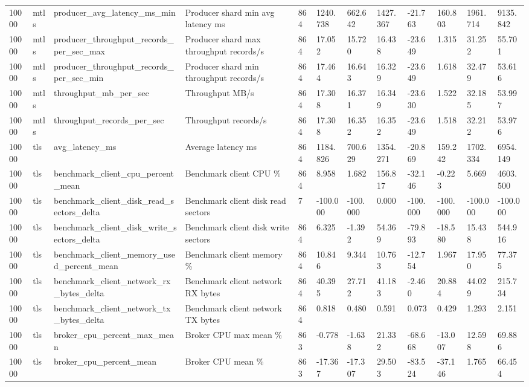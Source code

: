 \begin{longtable}{llllllllllll}
10000 & mtls & producer\_avg\_latency\_ms\_min & Producer shard min avg latency ms & 864 & 1240.738 & 662.642 & 1427.367 & -21.763 & 160.803 & 1961.714 & 9135.842 \\
10000 & mtls & producer\_throughput\_records\_per\_sec\_max & Producer shard max throughput records/s & 864 & 17.052 & 15.720 & 16.438 & -23.649 & 1.315 & 31.252 & 55.701 \\
10000 & mtls & producer\_throughput\_records\_per\_sec\_min & Producer shard min throughput records/s & 864 & 17.464 & 16.643 & 16.329 & -23.649 & 1.618 & 32.479 & 53.616 \\
10000 & mtls & throughput\_mb\_per\_sec & Throughput MB/s & 864 & 17.308 & 16.371 & 16.349 & -23.630 & 1.522 & 32.185 & 53.997 \\
10000 & mtls & throughput\_records\_per\_sec & Throughput records/s & 864 & 17.308 & 16.352 & 16.352 & -23.649 & 1.518 & 32.212 & 53.976 \\
10000 & tls & avg\_latency\_ms & Average latency ms & 864 & 1184.826 & 700.629 & 1354.271 & -20.869 & 159.242 & 1702.334 & 6954.149 \\
10000 & tls & benchmark\_client\_cpu\_percent\_mean & Benchmark client CPU \% & 864 & 8.958 & 1.682 & 156.817 & -32.146 & -0.223 & 5.669 & 4603.500 \\
10000 & tls & benchmark\_client\_disk\_read\_sectors\_delta & Benchmark client disk read sectors & 7 & -100.000 & -100.000 & 0.000 & -100.000 & -100.000 & -100.000 & -100.000 \\
10000 & tls & benchmark\_client\_disk\_write\_sectors\_delta & Benchmark client disk write sectors & 864 & 6.325 & -1.392 & 54.369 & -79.893 & -18.580 & 15.438 & 544.916 \\
10000 & tls & benchmark\_client\_memory\_used\_percent\_mean & Benchmark client memory \% & 864 & 10.846 & 9.344 & 10.763 & -12.754 & 1.967 & 17.950 & 77.375 \\
10000 & tls & benchmark\_client\_network\_rx\_bytes\_delta & Benchmark client network RX bytes & 864 & 40.395 & 27.712 & 41.183 & -2.460 & 20.884 & 44.029 & 215.734 \\
10000 & tls & benchmark\_client\_network\_tx\_bytes\_delta & Benchmark client network TX bytes & 864 & 0.818 & 0.480 & 0.591 & 0.073 & 0.429 & 1.293 & 2.151 \\
10000 & tls & broker\_cpu\_percent\_max\_mean & Broker CPU max mean \% & 863 & -0.778 & -1.638 & 21.332 & -68.668 & -13.007 & 12.598 & 69.886 \\
10000 & tls & broker\_cpu\_percent\_mean & Broker CPU mean \% & 863 & -17.367 & -17.307 & 29.503 & -83.524 & -37.146 & 1.765 & 66.454 \\

\end{longtable}
